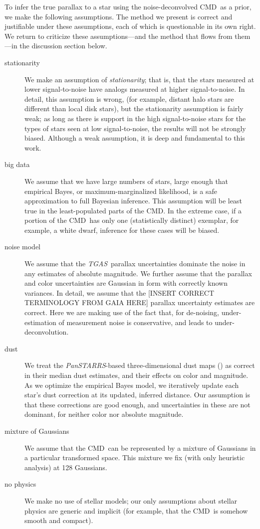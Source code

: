 \documentclass[modern]{aastex61}
\newcommand{\acronym}[1]{{\small{#1}}}
\newcommand{\project}[1]{\textsl{#1}}
\newcommand{\tgas}{\project{\acronym{TGAS}}}
\newcommand{\panstarrs}{\project{Pan\acronym{STARRS}}}
\newcommand{\cmd}{\acronym{CMD}}
\begin{document}
To infer the true parallax to a star using the noise-deconvolved \cmd\ as a prior, we make the following assumptions. The method we present is correct
and justifiable under these assumptions, each of which is questionable
in its own right. We return to criticize these assumptions---and the
method that flows from them---in the discussion section below.
\begin{description}
\item[stationarity] We make an assumption of \emph{stationarity}; that is, that the
  stars measured at lower signal-to-noise have analogs measured at
  higher signal-to-noise.  In detail, this assumption is wrong, (for example, distant halo stars are different than local
  disk stars), but the stationarity assumption is fairly weak; as long
  as there is support in the high signal-to-noise stars for the types
  of stars seen at low signal-to-noise, the results will not be
  strongly biased. Although a weak assumption, it is deep and fundamental to this
  work.
\item[big data] We assume that we have large numbers of stars, large enough that
  empirical Bayes, or maximum-marginalized likelihood, is a safe
  approximation to full Bayesian inference. This assumption will be
  least true in the least-populated parts of the \cmd. In the extreme
  case, if a portion of the \cmd\ has only one (statistically distinct)
  exemplar, for example, a white dwarf, inference for these cases will be biased.
\item[noise model] We assume that the \tgas\ parallax uncertainties dominate the
  noise in any estimates of absolute magnitude. We further assume that
  the parallax and color uncertainties are Gaussian in form with
  correctly known variances. In detail, we assume that the [INSERT
    CORRECT TERMINOLOGY FROM GAIA HERE] parallax uncertainty estimates
  are correct. Here we are making use of the fact that, for
  de-noising, under-estimation of measurement noise is conservative, and leads to under-deconvolution.
\item[dust] We treat the \panstarrs-based three-dimensional dust maps (\citealt{green15})
  as correct in their median dust estimates, and their
  effects on color and magnitude. As we optimize the empirical Bayes model, we iteratively update each star's
  dust correction at its updated, inferred distance. Our assumption is that these corrections are
  good enough, and uncertainties in these are not dominant, for neither
  color nor absolute magnitude.
\item[mixture of Gaussians] We assume that the \cmd\ can be represented by a mixture of
  Gaussians in a particular transformed space. This mixture we fix
  (with only heuristic analysis) at 128 Gaussians.
\item[no physics] We make no use of stellar models; our only assumptions about
  stellar physics are generic and implicit (for example, that the
  \cmd\ is somehow smooth and compact).
\end{description}
\end{document}
